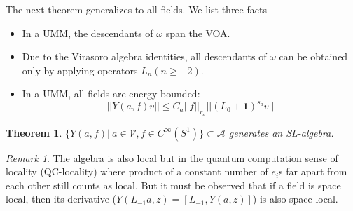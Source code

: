 \documentclass[twoside,11pt,titlepage]{amsart}
\renewcommand{\=}[1]{\stackrel{#1}{=}} %
\newtheorem{thm}{Theorem}[section]
\theoremstyle{definition}
\theoremstyle{remark}
\newtheorem{rmk}{Remark}
\begin{document}
The next theorem generalizes to all fields. We list three facts \cite{carpi2015vertex}
\begin{itemize}
    \item In a UMM, the descendants of $\omega$ span the VOA.
    \item Due to the Virasoro algebra identities, all descendants of $\omega$ can be obtained only by applying operators $L_n(n\ge-2)$.
    \item In a UMM, all fields are energy bounded:
    $$ ||Y(a,f)v|| \le C_{a}||f||_{r_a} ||(L_0+\textbf{1})^{s_a}v||$$
\end{itemize}
\begin{thm}\label{thm4.8}
$\{Y(a,f) | \ a \in \mathcal{V}, f \in C^\infty(S^1)\} \subset \mathcal{A}$ generates an SL-algebra.
\end{thm}
\begin{rmk}\label{rmk10}
The algebra is also local but in the quantum computation sense of locality (QC-locality) where product of a constant number of $e_i$s far apart from each other still counts as local. But it must be observed that if a field is space local, then its derivative ($Y(L_{-1}a,z)=[L_{-1},Y(a,z)]$) is also space local.
\end{rmk}
\end{document}
